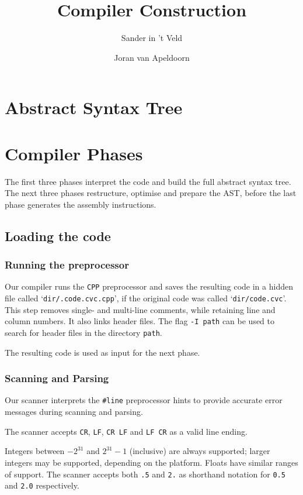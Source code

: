 \documentclass[a4paper,11pt]{report}
\title{Compiler Construction}
\author{Sander in 't Veld \and Joran van Apeldoorn}
\begin{document}
\maketitle
\tableofcontents


\chapter{Abstract Syntax Tree}

\chapter{Compiler Phases}
The first three phases interpret the code and build the full abstract syntax tree. The next three phases restructure, optimise and prepare the AST, before the last phase generates the assembly instructions.

\section{Loading the code}
\subsection{Running the preprocessor}
Our compiler runs the \texttt{CPP} preprocessor and saves the resulting code in a hidden file called `\texttt{dir/.code.cvc.cpp}', if the original code was called `\texttt{dir/code.cvc}'. This step removes single- and multi-line comments, while retaining line and column numbers. It also links header files. The flag \texttt{-I path} can be used to search for header files in the directory \texttt{path}.

The resulting code is used as input for the next phase.

\subsection{Scanning and Parsing}
Our scanner interprets the \texttt{\#line} preprocessor hints to provide accurate error messages during scanning and parsing.

The scanner accepts \texttt{CR}, \texttt{LF}, \texttt{CR LF} and \texttt{LF CR} as a valid line ending.

Integers between $-2^{31}$ and $2^{31}-1$ (inclusive) are always supported; larger integers may be supported, depending on the platform. Floats have similar ranges of support. The scanner accepts both \texttt{.5} and \texttt{2.} as shorthand notation for \texttt{0.5} and \texttt{2.0} respectively.
\end{document}
